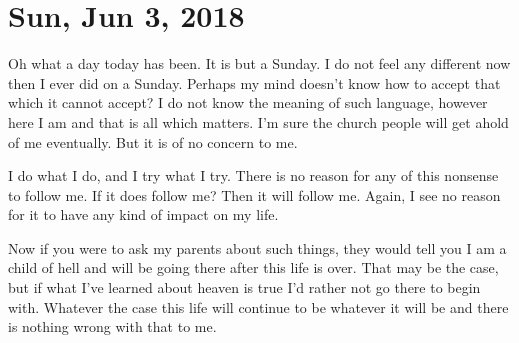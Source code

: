 \section{Sun, Jun 3, 2018}

Oh what a day today has been. It is but a Sunday. I do not feel any different
now then I ever did on a Sunday. Perhaps my mind doesn't know how to accept that
which it cannot accept? I do not know the meaning of such language, however here
I am and that is all which matters. I'm sure the church people will get ahold of
me eventually. But it is of no concern to me.

I do what I do, and I try what I try. There is no reason for any of this
nonsense to follow me. If it does follow me? Then it will follow me. Again, I
see no reason for it to have any kind of impact on my life.

Now if you were to ask my parents about such things, they would tell you I am a
child of hell and will be going there after this life is over. That may be the
case, but if what I've learned about heaven is true I'd rather not go there to
begin with. Whatever the case this life will continue to be whatever it will be
and there is nothing wrong with that to me.